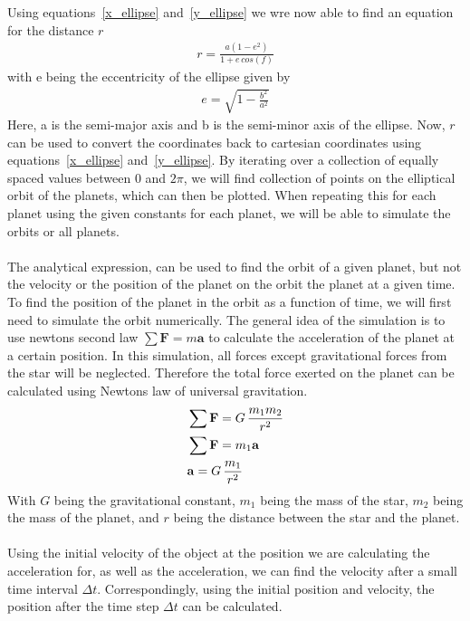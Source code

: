 \documentclass[reprint,english,notitlepage]{revtex4-2}
\begin{document}
Using equations~\ref{x_ellipse} and~\ref{y_ellipse} we wre now able to find an equation for the distance $r$
\begin{align*}
    r = \frac{a(1-e^2)}{1 + e\,cos(f)}
\end{align*}
with e being the eccentricity of the ellipse given by
\begin{align*}
    e = \sqrt{1-\frac{b^2}{a^2}}
\end{align*}
Here, a is the semi-major axis and b is the semi-minor axis of the ellipse.
Now, $r$ can be used to convert the coordinates back to cartesian coordinates using equations~\ref{x_ellipse} and~\ref{y_ellipse}.
By iterating over a collection of equally spaced values between $0$ and $2\pi$, we will find collection of points on the elliptical orbit of the planets, which can then be plotted.
When repeating this for each planet using the given constants for each planet, we will be able to simulate the orbits or all planets.\\\\
The analytical expression, can be used to find the orbit of a given planet, but not the velocity or the position of the planet on the orbit the planet at a given time.
To find the position of the planet in the orbit as a function of time, we will first need to simulate the orbit numerically.
The general idea of the simulation is to use newtons second law $\sum\textbf{F} = m\textbf{a}$ to calculate the acceleration of the planet at a certain position.
In this simulation, all forces except gravitational forces from the star will be neglected.
Therefore the total force exerted on the planet can be calculated using Newtons law of universal gravitation.
\begin{align*}
    &\sum\textbf{F} = G\,\frac{m_1 m_2}{r^2} \label{Newton_Grav_law}\\
	&\sum\textbf{F} = m_1 \textbf{a}\\
	&\bold{a} = G\,\frac{m_1}{r^2}
\end{align*}
With $G$ being the gravitational constant, $m_1$ being the mass of the star, $m_2$ being the mass of the planet, and $r$ being the distance between the star and the planet.\\\\
Using the initial velocity of the object at the position we are calculating the acceleration for, as well as the acceleration, we can find the velocity after a small time interval $\Delta t$.
Correspondingly, using the initial position and velocity, the position after the time step $\Delta t$ can be calculated.
\end{document}
